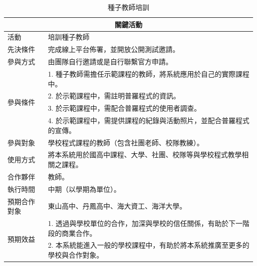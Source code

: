 \begin{table}[H]
  \centering
  \caption{種子教師培訓}
  \begin{tabular}{|l|l|}
      \hline
      \multicolumn{2}{|c|}{\textbf{關鍵活動}} \\ \hline
      活動 & 培訓種子教師 \\ \hline
      先決條件 & 完成線上平台佈署，並開放公開測試邀請。 \\ \hline
      參與方式 & 由團隊自行邀請或是自行聯繫官方申請。 \\ \hline
      \multirow{4}{*}{參與條件}       
      & 1. 種子教師需擔任示範課程的教師，將系統應用於自己的實際課程中。\\
      & 2. 於示範課程中，需註明普羅程式的資訊。 \\ 
      & 3. 於示範課程中，需配合普羅程式的使用者調查。 \\ 
      & 4. 於示範課程中，需提供課程的紀錄與活動照片，並配合普羅程式的宣傳。 \\ \hline
      參與對象 & 學校程式課程的教師（包含社團老師、校隊教練）。 \\ \hline
      使用方式 & 將本系統用於國高中課程、大學、社團、校隊等與學校程式教學相關之課程。 \\ \hline 
      合作夥伴 & 教師。 \\ \hline 
      執行時間 & 中期（以學期為單位）。 \\ \hline
      預期合作對象 & 東山高中、丹鳳高中、海大資工、海洋大學。 \\ \hline
      \multirow{2}{*}{預期效益}    
      & 1. 透過與學校單位的合作，加深與學校的信任關係，有助於下一階段的商業合作。 \\
      & 2. 本系統能進入一般的學校課程中，有助於將本系統推廣至更多的學校與合作對象。 \\ \hline
  \end{tabular}
\end{table}

